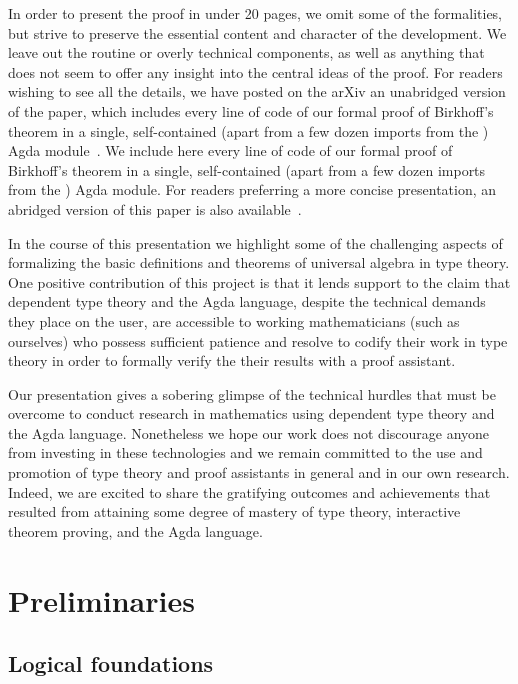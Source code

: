 In order to present the proof in under 20 pages, we omit some of the formalities,
but strive to preserve the essential content and character of the development.
We leave out the routine or overly technical components, as well as anything that does not
seem to offer any insight into the central ideas of the proof. For readers wishing to see all the
details, we have posted on the arXiv an unabridged version of the paper, which includes
every line of code of our formal proof of Birkhoff's theorem in a single, self-contained
(apart from a few dozen imports from the \agdastdlib) Agda module~\cite{DeMeo:2021b}.
\else
We include here every line of code of our formal proof of Birkhoff's theorem
in a single, self-contained (apart from a few dozen imports from the \agdastdlib) Agda
module.
For readers preferring a more concise presentation, an abridged version of this paper is also
available~\cite{DeMeo:2021c}.
\fi

In the course of this presentation we highlight some of the challenging aspects of
formalizing the basic definitions and theorems of universal algebra in type theory.
One positive contribution of this project is that it lends support to the claim that
dependent type theory and the Agda language, despite the technical demands they place on
the user, are accessible to working mathematicians (such as ourselves) who possess
sufficient patience and resolve to codify their work in type theory in order to formally verify
the their results with a proof assistant.

\ifshort\else
Our presentation gives a sobering glimpse of the technical hurdles that must be overcome
to conduct research in mathematics using dependent type theory and the Agda language.
Nonetheless we hope our work does not discourage anyone from investing in these
technologies and we remain committed to the use and promotion of type theory and proof
assistants in general and in our own research. Indeed, we are excited to share the
gratifying outcomes and achievements that resulted from attaining some degree of mastery
of type theory, interactive theorem proving, and the Agda language.
\fi

\section{Preliminaries}

\subsection{Logical foundations}

